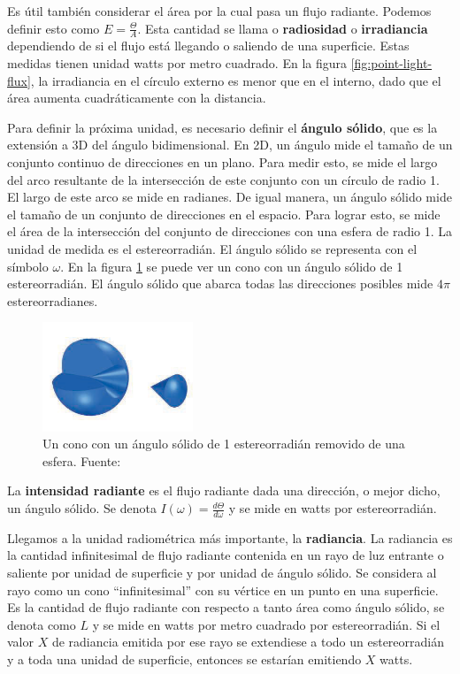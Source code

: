 Es útil también considerar el área por la cual pasa un flujo radiante.
Podemos definir esto como $E = \frac{\Theta}{A}$.
Esta cantidad se llama o \textbf{radiosidad} o \textbf{irradiancia} dependiendo de si el flujo está llegando o saliendo de una superficie.
Estas medidas tienen unidad watts por metro cuadrado.
En la figura \ref{fig:point-light-flux}, la irradiancia en el círculo externo es menor que en el interno, dado que el área aumenta cuadráticamente con la distancia.

Para definir la próxima unidad, es necesario definir el \textbf{ángulo sólido}, que es la extensión a 3D del ángulo bidimensional.
En 2D, un ángulo mide el tamaño de un conjunto continuo de direcciones en un plano.
Para medir esto, se mide el largo del arco resultante de la intersección de este conjunto con un círculo de radio 1.
El largo de este arco se mide en radianes.
De igual manera, un ángulo sólido mide el tamaño de un conjunto de direcciones en el espacio.
Para lograr esto, se mide el área de la intersección del conjunto de direcciones con una esfera de radio 1.
La unidad de medida es el estereorradián.
El ángulo sólido se representa con el símbolo $\omega$.
En la figura \ref{fig:steradian} se puede ver un cono con un ángulo sólido de 1 estereorradián.
El ángulo sólido que abarca todas las direcciones posibles mide $4\pi$ estereorradianes.

\begin{figure}[ht]
    \centering
    \includegraphics[width=0.4\textwidth]{steradians.png}
    \caption{Un cono con un ángulo sólido de 1 estereorradián removido de una esfera. Fuente: \cite{rtr}}
    \label{fig:steradian}
\end{figure}

La \textbf{intensidad radiante} es el flujo radiante dada una dirección, o mejor dicho, un ángulo sólido.
Se denota $I(\omega) = \frac{d\Theta}{d\omega}$ y se mide en watts por estereorradián.

Llegamos a la unidad radiométrica más importante, la \textbf{radiancia}.
La radiancia es la cantidad infinitesimal de flujo radiante contenida en un rayo de luz entrante o saliente por unidad de superficie y por unidad de ángulo sólido.
Se considera al rayo como un cono ``infinitesimal'' con su vértice en un punto en una superficie.
Es la cantidad de flujo radiante con respecto a tanto área como ángulo sólido, se denota como $L$ y se mide en watts por metro cuadrado por estereorradián.
Si el valor $X$ de radiancia emitida por ese rayo se extendiese a todo un estereorradián y a toda una unidad de superficie, entonces se estarían emitiendo $X$ watts.

